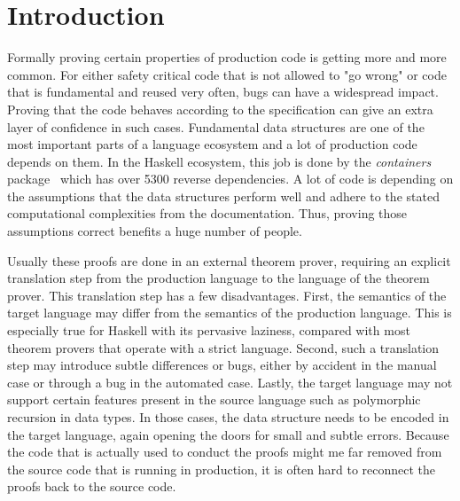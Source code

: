 \documentclass[sigplan,screen]{acmart}
\begin{document}

\maketitle

\section{Introduction}

Formally proving certain properties of production code is getting more and more common. For either safety critical code that is not allowed to "go wrong" or code that is fundamental and reused very often, bugs can have a widespread impact. Proving that the code behaves according to the specification can give an extra layer of confidence in such cases. Fundamental data structures are one of the most important parts of a language ecosystem and a lot of production code depends on them. In the Haskell ecosystem, this job is done by the \textit{containers} package~\cite{containers} which has over 5300 reverse dependencies. A lot of code is depending on the assumptions that the data structures perform well and adhere to the stated computational complexities from the documentation. Thus, proving those assumptions correct benefits a huge number of people.

Usually these proofs are done in an external theorem prover, requiring an explicit translation step from the production language to the language of the theorem prover. This translation step has a few disadvantages. First, the semantics of the target language may differ from the semantics of the production language. This is especially true for Haskell with its pervasive laziness, compared with most theorem provers that operate with a strict language. Second, such a translation step may introduce subtle differences or bugs, either by accident in the manual case or through a bug in the automated case. Lastly, the target language may not support certain features present in the source language such as polymorphic recursion in data types. In those cases, the data structure needs to be encoded in the target language, again opening the doors for small and subtle errors. Because the code that is actually used to conduct the proofs might me far removed from the source code that is running in production, it is often hard to reconnect the proofs back to the source code.
\end{document}
